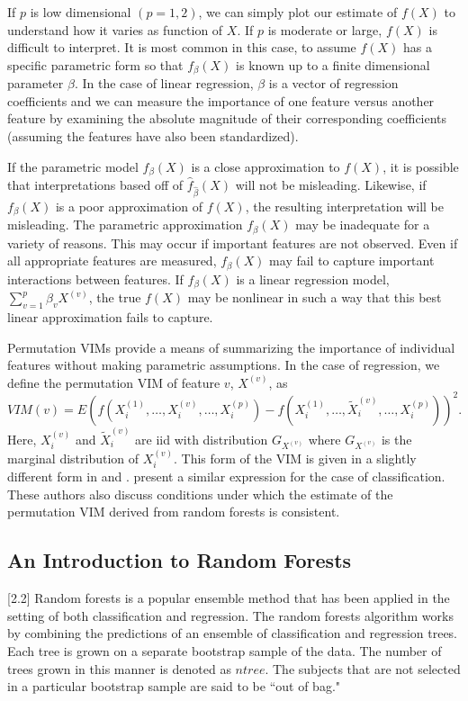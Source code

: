 \documentclass[article,shortnames]{jss}
\begin{document}
If $p$ is low dimensional $(p=1,2)$, we can simply plot our estimate of $f(X)$ to understand how it varies as function of $X$. 
If $p$ is moderate or large, $f(X)$ is difficult to interpret.  It is most common in this case, to assume $f(X)$ has a specific parametric
form so that $f_{\beta}(X)$ is known up to a finite dimensional parameter $\beta$.  In the case of linear regression, 
$\beta$ is a vector of regression coefficients and we can measure the importance of one feature versus another feature by examining the absolute magnitude 
of their corresponding coefficients (assuming the features have also been standardized).    

If the parametric model $f_{\beta}(X)$ is a close approximation to $f(X)$, it is possible that interpretations based off of $\hat{f}_{\hat{\beta}}(X)$
will not be misleading.  Likewise, if $f_{\beta}(X)$ is a poor approximation of $f(X)$, the resulting interpretation will be misleading.  
The parametric approximation $f_{\beta}(X)$ may be inadequate for a variety of reasons.  This may occur if important features are 
not observed.  Even if all appropriate features are measured, $f_{\beta}(X)$ may fail to capture important interactions between features.
If $f_{\beta}(X)$ is a linear regression model, $\sum_{v=1}^{p}\beta_{v}X^{(v)}$, the true $f(X)$ may be nonlinear in such a way that this best linear approximation fails to capture.
  
Permutation VIMs provide a means of summarizing the importance of individual features without making parametric assumptions.
In the case of regression, we define the permutation VIM of feature $v$, $X^{(v)}$, as 
\begin{equation}
VIM(v)=E(f(X^{(1)}_{i},\ldots,X^{(v)}_{i},\ldots,X^{(p)}_{i}) - f(X^{(1)}_{i},\ldots,\tilde{X}^{(v)}_{i},\ldots,X^{(p)}_{i}))^{2}.
\end{equation}
Here, $X^{(v)}_{i}$ and $\tilde{X}^{(v)}_{i}$ are iid with distribution $G_{X^{(v)}}$ where $G_{X^{(v)}}$ is the marginal distribution of $X^{(v)}_{i}$.  This form of the VIM
is given in a slightly different form in \cite{gregorutti2013correlation} and \cite{zhu2012reinforcement}.
\cite{gregorutti2013correlation} present a similar expression for the case of classification.  
These authors also discuss conditions under which the estimate of the permutation VIM derived from random forests is consistent. 

         
\subsection{An Introduction to Random Forests}[2.2]
Random forests is a popular ensemble method that has been applied in the setting of both classification and regression.  The random forests algorithm works
by combining the predictions of an ensemble of classification and regression trees.  Each tree is grown on a separate bootstrap sample of the data.  The number
of trees grown in this manner is denoted as $ntree$.  The subjects that are not selected in a particular bootstrap sample are said to be ``out of bag."  
\end{document}
